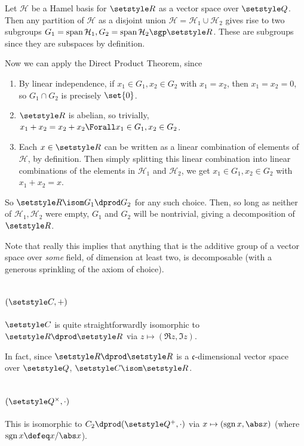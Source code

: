\documentclass[fleqn,a4paper,11pt]{article}
\begin{document}
Let \(\mathcal H\) be a Hamel basis for \(\R\) as a vector space over \(\Q\).
Then any partition of \(\mathcal H\) as a disjoint union
\(\mathcal H = \mathcal H_1 \cup \mathcal H_2\) gives rise to two subgroups
\(G_1 = \vspan \mathcal H_1, G_2 = \vspan \mathcal H_2 \sgp \R\). These are
subgroups since they are subspaces by definition.

Now we can apply the Direct Product Theorem, since
\begin{enumerate}[label=(\roman*)]
 \item
  By linear independence, if \(x_1 \in G_1, x_2 \in G_2\) with \(x_1 = x_2\),
  then \(x_1 = x_2 = 0\), so \(G_1 \cap G_2\) is precisely \(\set{0}\).
 \item
  \(\R\) is abelian, so trivially,
  \(x_1 + x_2 = x_2 + x_2 \Forall x_1 \in G_1, x_2 \in G_2\).
 \item
  Each \(x \in \R\) can be written as a linear combination of elements of
  \(\mathcal H\), by definition. Then simply splitting this linear combination
  into linear combinations of the elements in \(\mathcal H_1\) and
  \(\mathcal H_2\), we get \(x_1 \in G_1, x_2 \in G_2\) with \(x_1 + x_2 = x\).
\end{enumerate}
So \(\R \isom G_1 \dprod G_2\) for any such choice. Then, so long as neither of
\(\mathcal H_1, \mathcal H_2\) were empty, \(G_1\) and \(G_2\) will be
nontrivial, giving a decomposition of \(\R\).

Note that really this implies that anything that is the additive group of a
vector space over \emph{some} field, of dimension at least two, is decomposable
(with a generous sprinkling of the axiom of choice).

\section{\((\CC, +)\)}

\(\CC\) is quite straightforwardly isomorphic to \(\R \dprod \R\) via \(z
\mapsto (\Re z, \Im z)\).

In fact, since \(\R \dprod \R\) is a \(\mathfrak c\)-dimensional vector space
over \(\Q\), \(\CC \isom \R\).

\section{\((\Q^\times, \cdot)\)}

This is isomorphic to \(C_2 \dprod (\Q^+, \cdot)\) via
\(x \mapsto (\sgn x, \abs x)\) (where \(\sgn x \defeq x/\abs x\)).
\end{document}
